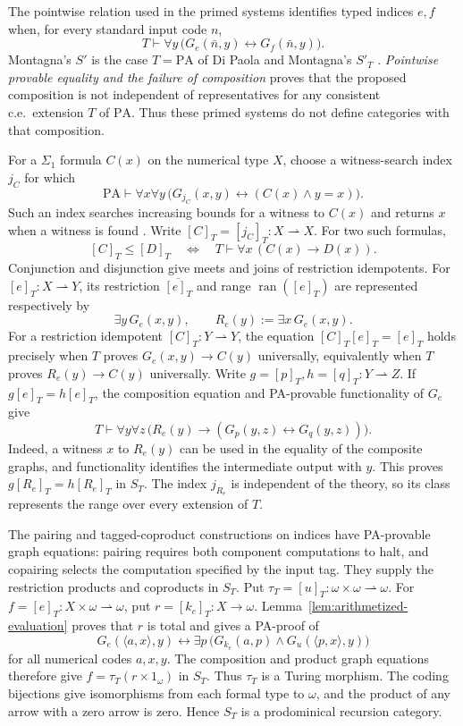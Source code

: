 \documentclass[11pt]{article}
\newcommand{\PA}{\mathrm{PA}}
\newcommand{\ran}{\operatorname{ran}}
\begin{document}
The pointwise relation used in the primed systems identifies typed
indices $e,f$ when, for every standard input code $n$,
\[
 T\vdash\forall y\,
   \bigl(G_e(\bar n,y)\leftrightarrow G_f(\bar n,y)\bigr).
\]
Montagna's $S'$ is the case
$T=\PA$ of Di Paola and Montagna's $S'_T$ \cite{Montagna,DPM}.
\emph{Pointwise provable equality and the failure of composition}
\cite[Corollary 2]{Composition} proves that the proposed composition
is not independent of representatives for any consistent c.e.\
extension $T$ of $\PA$. Thus these primed systems do not define
categories with that composition.

For a $\Sigma_1$ formula $C(x)$ on the numerical type $X$, choose
a witness-search index $j_C$ for which
\[
 \PA\vdash\forall x\forall y\,
 \bigl(G_{j_C}(x,y)\leftrightarrow(C(x)\land y=x)\bigr).
\]
Such an index searches increasing bounds for a witness to $C(x)$
and returns $x$ when a witness is found
\cite[p.~109, equation~$(*)$]{Montagna}. Write
$[C]_T=[j_C]_T:X\rightharpoonup X$.
For two such formulas,
\begin{equation}\label{eq:domain-order}
 [C]_T\le[D]_T
 \quad\Longleftrightarrow\quad
 T\vdash\forall x\,(C(x)\longrightarrow D(x)).
\end{equation}
Conjunction and disjunction give meets and joins of restriction
idempotents. For $[e]_T:X\rightharpoonup Y$, its restriction
$\overline{[e]_T}$ and range $\ran([e]_T)$ are represented respectively by
\[
 \exists y\,G_e(x,y),\qquad
 R_e(y):=\exists x\,G_e(x,y).
\]
For a restriction idempotent $[C]_T:Y\rightharpoonup Y$, the
equation $[C]_T[e]_T=[e]_T$ holds precisely when
$T$ proves $G_e(x,y)\to C(y)$ universally, equivalently when
$T$ proves $R_e(y)\to C(y)$ universally.
Write $g=[p]_T,h=[q]_T:Y\rightharpoonup Z$.
If $g[e]_T=h[e]_T$, the
composition equation and PA-provable functionality of $G_e$ give
\[
 T\vdash\forall y\forall z\,
 \bigl(R_e(y)\longrightarrow
       (G_p(y,z)\leftrightarrow G_q(y,z))\bigr).
\]
Indeed, a witness $x$ to $R_e(y)$ can be used in the equality of
the composite graphs, and functionality identifies the intermediate
output with $y$. This proves $g[R_e]_T=h[R_e]_T$ in $S_T$.
The index $j_{R_e}$ is independent of the theory, so its class
represents the range over every extension of $T$.

The pairing and tagged-coproduct constructions on indices have
PA-provable graph equations: pairing requires both component
computations to halt, and copairing selects the computation
specified by the input tag. They supply the restriction products
and coproducts in $S_T$.
Put $\tau_T=[u]_T:\omega\times\omega\rightharpoonup\omega$.
For $f=[e]_T:X\times\omega\rightharpoonup\omega$, put
$r=[k_e]_T:X\to\omega$. Lemma~\ref{lem:arithmetized-evaluation}
proves that $r$ is total and gives a PA-proof of
\[
 G_e(\langle a,x\rangle,y)\leftrightarrow
 \exists p\,
 \bigl(G_{k_e}(a,p)\land G_u(\langle p,x\rangle,y)\bigr)
\]
for all numerical codes $a,x,y$.
The composition and product graph equations therefore give
$f=\tau_T(r\times1_\omega)$ in $S_T$.
Thus $\tau_T$ is a Turing morphism. The coding bijections give
isomorphisms from each formal type to $\omega$, and the product
of any arrow with a zero arrow is zero. Hence $S_T$ is a
prodominical recursion category.
\end{document}
